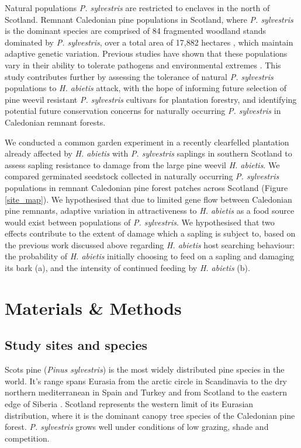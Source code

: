 \documentclass[a4paper, 11pt]{article}
\begin{document}
Natural populations \textit{P. sylvestris} are restricted to enclaves in the north of Scotland. Remnant Caledonian pine populations in Scotland, where \textit{P. sylvestris} is the dominant species \citep{Edwards2006} are comprised of 84 fragmented woodland stands dominated by \textit{P. sylvestris}, over a total area of 17,882 hectares \citep{Mason2004}, which maintain adaptive genetic variation. Previous studies have shown that these populations vary in their ability to tolerate pathogens \citep{Perry2016} and environmental extremes \citep{Salmela2013}. This study contributes further by assessing the tolerance of natural \textit{P. sylvestris} populations to \textit{H. abietis} attack, with the hope of informing future selection of pine weevil resistant \textit{P. sylvestris} cultivars for plantation forestry, and identifying potential future conservation concerns for naturally occurring \textit{P. sylvestris} in Caledonian remnant forests. 

We conducted a common garden experiment in a recently clearfelled plantation already affected by \textit{H. abietis} with \textit{P. sylvestris} saplings in southern Scotland to assess sapling resistance to damage from the large pine weevil \textit{H. abietis}. We compared germinated seedstock collected in naturally occurring \textit{P. sylvestris} populations in remnant Caledonian pine forest patches across Scotland (Figure \ref{site_map}). We hypothesised that due to limited gene flow between Caledonian pine remnants, adaptive variation in attractiveness to \textit{H. abietis} as a food source would exist between populations of \textit{P. sylvestris}. We hypothesised that two effects contribute to the extent of damage which a sapling is subject to, based on the previous work discussed above regarding \textit{H. abietis} host searching behaviour: the probability of \textit{H. abietis} initially choosing to feed on a sapling and damaging its bark (a), and the intensity of continued feeding by \textit{H. abietis} (b). 

\section*{Materials \& Methods}

\subsection*{Study sites and species}

Scots pine (\textit{Pinus sylvestris}) is the most widely distributed pine species in the world. It's range spans Eurasia from the arctic circle in Scandinavia to the dry northern mediterranean in Spain and Turkey and from Scotland to the eastern edge of Siberia \citep{GBIF2019, Carlisle1968}. Scotland represents the western limit of its Eurasian distribution, where it is the dominant canopy tree species of the Caledonian pine forest. \textit{P. sylvestris} grows well under conditions of low grazing, shade and competition. 
\end{document}
